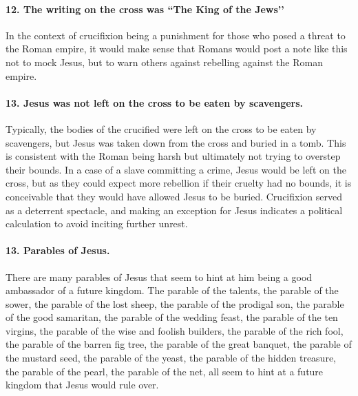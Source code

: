 \paragraph{12.
The writing on the cross was ``The King of the Jews’’}\label{par:the-writing-on-the-cross-was-the-king-of-the-jews}
In the context of crucifixion being a punishment for those who posed a threat to the Roman empire, it would make sense that Romans would post a note like this not to mock Jesus, but to warn others against rebelling against the Roman empire.
\paragraph{13.
Jesus was not left on the cross to be eaten by scavengers.}\label{par:jesus-was-not-left-on-the-cross-to-be-eaten-by-scavengers.}
Typically, the bodies of the crucified were left on the cross to be eaten by scavengers, but Jesus was taken down from the cross and buried in a tomb.
This is consistent with the Roman being harsh but ultimately not trying to overstep their bounds.
In a case of a slave committing a crime, Jesus would be left on the cross, but as they could expect more rebellion if their cruelty had no bounds, it is conceivable that they would have allowed Jesus to be buried.
Crucifixion served as a deterrent spectacle, and making an exception for Jesus indicates a political calculation to avoid inciting further unrest.
\paragraph{13.
Parables of Jesus.}\label{par:parables-of-jesus.}
There are many parables of Jesus that seem to hint at him being a good ambassador of a future kingdom.
The parable of the talents, the parable of the sower, the parable of the lost sheep, the parable of the prodigal son, the parable of the good samaritan, the parable of the wedding feast, the parable of the ten virgins, the parable of the wise and foolish builders, the parable of the rich fool, the parable of the barren fig tree, the parable of the great banquet, the parable of the mustard seed, the parable of the yeast, the parable of the hidden treasure, the parable of the pearl, the parable of the net, all seem to hint at a future kingdom that Jesus would rule over.

